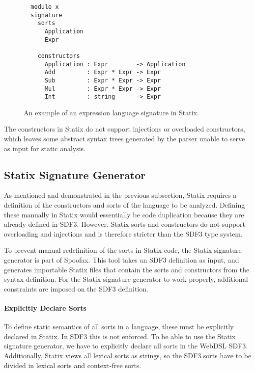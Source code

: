       \begin{wrapfigure}{r}{0.58\linewidth}
        \capstart
        \begin{verbatim}
  module x
  signature
    sorts
      Application
      Expr
    
    constructors
      Application : Expr        -> Application
      Add         : Expr * Expr -> Expr
      Sub         : Expr * Expr -> Expr
      Mul         : Expr * Expr -> Expr
      Int         : string      -> Expr
        \end{verbatim}
        \caption{\label{fig:statix-expression-language}An example of an expression language signature in Statix.}
      \end{wrapfigure}

      The constructors in Statix do not support injections or overloaded constructors, which leaves some abstract syntax trees generated by the parser unable to serve as input for static analysis.

    \subsection{\label{subsec:statix-signature-generator}Statix Signature Generator}

      As mentioned and demonstrated in the previous subsection, Statix requires a definition of the constructors and sorts of the language to be analyzed. Defining these manually in Statix would essentially be code duplication because they are already defined in SDF3. However, Statix sorts and constructors do not support overloading and injections and is therefore stricter than the SDF3 type system.

      To prevent manual redefinition of the sorts in Statix code, the Statix signature generator is part of Spoofax. This tool takes an SDF3 definition as input, and generates importable Statix files that contain the sorts and constructors from the syntax definition. For the Statix signature generator to work properly, additional constraints are imposed on the SDF3 definition.

      \paragraph{Explicitly Declare Sorts} To define static semantics of all sorts in a language, these must be explicitly declared in Statix. In SDF3 this is not enforced. To be able to use the Statix signature generator, we have to explicitly declare all sorts in the WebDSL SDF3. Additionally, Statix views all lexical sorts as strings, so the SDF3 sorts have to be divided in lexical sorts and context-free sorts.

